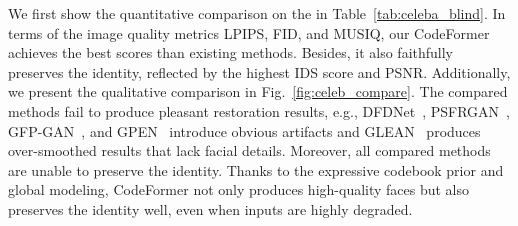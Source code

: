 \begin{table}[b]
\begin{minipage}[c]{0.505\textwidth}
		\vspace{1mm}
		\label{tab:real_test}
		\tabcolsep=0.1cm
	\end{minipage}
\end{table}


We first show the quantitative comparison on the  in Table~\ref{tab:celeba_blind}. In terms of the image quality metrics LPIPS, FID, and MUSIQ, our CodeFormer achieves the best scores than existing methods. Besides, it also faithfully preserves the identity, reflected by the highest IDS score and PSNR. 
Additionally, we present the qualitative comparison in Fig.~\ref{fig:celeb_compare}. The compared methods fail to produce pleasant restoration results, e.g., DFDNet~\cite{li2020blind}, PSFRGAN~\cite{chen2021progressive}, GFP-GAN~\cite{wang2021towards}, and GPEN~\cite{yang2021gan} introduce obvious artifacts and GLEAN~\cite{chan2022glean} produces over-smoothed results that lack facial details. Moreover, all compared methods are unable to preserve the identity.
Thanks to the expressive codebook prior and global modeling, CodeFormer not only produces high-quality faces but also preserves the identity well, even when inputs are highly degraded.


